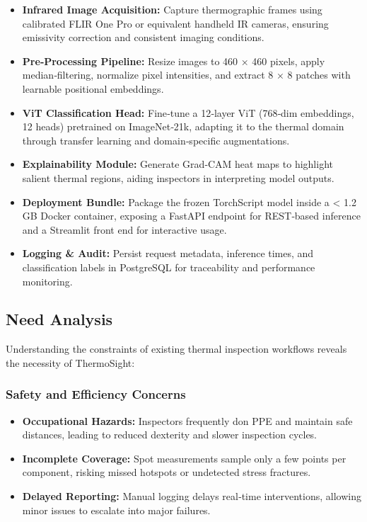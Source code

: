 \begin{itemize}
    \item \textbf{Infrared Image Acquisition:} Capture thermographic frames using calibrated FLIR One Pro or equivalent handheld IR cameras, ensuring emissivity correction and consistent imaging conditions.
    \item \textbf{Pre‐Processing Pipeline:} Resize images to 460 × 460 pixels, apply median‐filtering, normalize pixel intensities, and extract 8 × 8 patches with learnable positional embeddings.
    \item \textbf{ViT Classification Head:} Fine‐tune a 12‐layer ViT (768‐dim embeddings, 12 heads) pretrained on ImageNet‐21k, adapting it to the thermal domain through transfer learning and domain‐specific augmentations.
    \item \textbf{Explainability Module:} Generate Grad‐CAM heat maps to highlight salient thermal regions, aiding inspectors in interpreting model outputs.
    \item \textbf{Deployment Bundle:} Package the frozen TorchScript model inside a < 1.2 GB Docker container, exposing a FastAPI endpoint for REST‐based inference and a Streamlit front end for interactive usage.
    \item \textbf{Logging & Audit:} Persist request metadata, inference times, and classification labels in PostgreSQL for traceability and performance monitoring.
\end{itemize}

\subsection{Need Analysis}
Understanding the constraints of existing thermal inspection workflows reveals the necessity of ThermoSight:

\subsubsection*{Safety and Efficiency Concerns}
\begin{itemize}
    \item \textbf{Occupational Hazards:} Inspectors frequently don PPE and maintain safe distances, leading to reduced dexterity and slower inspection cycles.
    \item \textbf{Incomplete Coverage:} Spot measurements sample only a few points per component, risking missed hotspots or undetected stress fractures.
    \item \textbf{Delayed Reporting:} Manual logging delays real‐time interventions, allowing minor issues to escalate into major failures.
\end{itemize}


